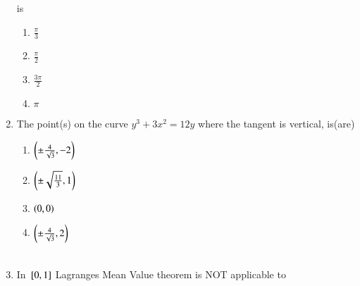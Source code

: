 \documentclass[journal]{IEEEtran}
\begin{document}
\begin{enumerate}[start=9]
is \hfill {}
\begin{multicols}{2}
\begin{enumerate}
    \item $\frac{\pi}{3}$\\
    \item $\frac{\pi}{2}$\\
    \item $\frac{3\pi}{2}$\\
    \item $\pi$
\end{enumerate}
\end{multicols}
\item The point(s) on the curve $y^3+3x^2=12y$ where the tangent is vertical, is(are)
\hfill {}\\
\begin{multicols}{2}
\begin{enumerate}
    \item $\left(\pm \frac{4}{\sqrt{3}},-2\right)$\\
    \item $\left(\pm\sqrt{\frac{11}{3}},1\right)$\\
    \item $\left(0,0\right)$\\
    \item $\left(\pm \frac{4}{\sqrt{3}},2\right)$\\\\
\end{enumerate}
\end{multicols}
\item In ${}\left[0,1\right]$ Lagranges Mean Value theorem is NOT applicable to
\hfill {}


\end{enumerate}
\end{document}
